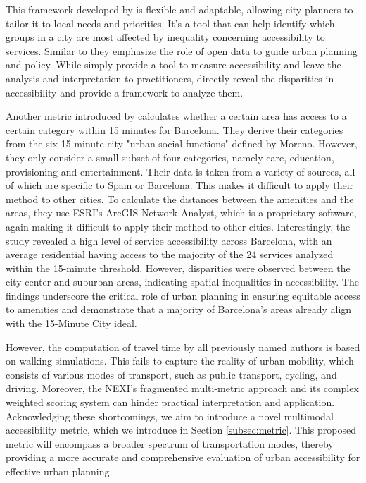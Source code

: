 This framework developed by  is flexible and adaptable, allowing city planners to tailor it to local needs and priorities. 
It's a tool that can help identify which groups in a city are most affected by inequality concerning accessibility to services. 
Similar to  they emphasize the role of open data to guide urban planning and policy.
While  simply provide a tool to measure accessibility and leave the analysis and interpretation to practitioners,  directly reveal the disparities in accessibility and provide a framework to analyze them.

Another metric introduced by  calculates whether a certain area has access to a certain category within 15 minutes for Barcelona.
They derive their categories from the six 15-minute city "urban social functions" defined by Moreno.
However, they only consider a small subset of four categories, namely care, education, provisioning and entertainment.
Their data is taken from a variety of sources, all of which are specific to Spain or Barcelona.
This makes it difficult to apply their method to other cities.
To calculate the distances between the amenities and the areas, they use ESRI's ArcGIS Network Analyst, which is a proprietary software, again making it difficult to apply their method to other cities.
Interestingly, the study revealed a high level of service accessibility across Barcelona, with an average residential having access to the majority of the 24 services analyzed within the 15-minute threshold. 
However, disparities were observed between the city center and suburban areas, indicating spatial inequalities in accessibility.
The findings underscore the critical role of urban planning in ensuring equitable access to amenities and demonstrate that a majority of Barcelona's areas already align with the 15-Minute City ideal. 

However, the computation of travel time by all previously named authors is based on walking simulations. 
This fails to capture the reality of urban mobility, which consists of various modes of transport, such as public transport, cycling, and driving.
Moreover, the NEXI's fragmented multi-metric approach and its complex weighted scoring system can hinder practical interpretation and application.
Acknowledging these shortcomings, we aim to introduce a novel multimodal accessibility metric, which we introduce in Section \ref{subsec:metric}.
This proposed metric will encompass a broader spectrum of transportation modes, thereby providing a more accurate and comprehensive evaluation of urban accessibility for effective urban planning.

